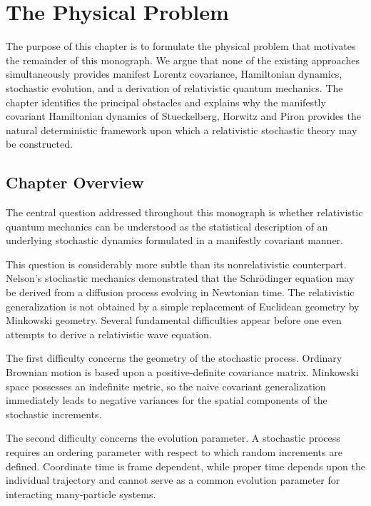 
\chapter{The Physical Problem}

The purpose of this chapter is to formulate the physical problem that
motivates the remainder of this monograph. We argue that none of the
existing approaches simultaneously provides manifest Lorentz covariance,
Hamiltonian dynamics, stochastic evolution, and a derivation of
relativistic quantum mechanics. The chapter identifies the principal
obstacles and explains why the manifestly covariant Hamiltonian dynamics
of Stueckelberg, Horwitz and Piron provides the natural deterministic
framework upon which a relativistic stochastic theory may be constructed.

\section{Chapter Overview}

The central question addressed throughout this monograph is whether
relativistic quantum mechanics can be understood as the statistical
description of an underlying stochastic dynamics formulated in a
manifestly covariant manner.

This question is considerably more subtle than its nonrelativistic
counterpart. Nelson's stochastic mechanics demonstrated that the
Schrödinger equation may be derived from a diffusion process evolving in
Newtonian time. The relativistic generalization is not obtained by a
simple replacement of Euclidean geometry by Minkowski geometry. Several
fundamental difficulties appear before one even attempts to derive a
relativistic wave equation.

The first difficulty concerns the geometry of the stochastic process.
Ordinary Brownian motion is based upon a positive-definite covariance
matrix. Minkowski space possesses an indefinite metric, so the naive
covariant generalization immediately leads to negative variances for the
spatial components of the stochastic increments.

The second difficulty concerns the evolution parameter. A stochastic
process requires an ordering parameter with respect to which random
increments are defined. Coordinate time is frame dependent, while proper
time depends upon the individual trajectory and cannot serve as a common
evolution parameter for interacting many-particle systems.

